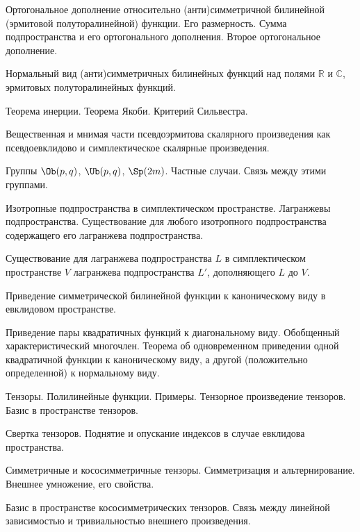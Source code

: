 \documentclass[a4paper]{article}
\begin{document}
\begin{nums}{-2}
\item  Ортогональное    дополнение    относительно
(анти)симметричной билинейной (эрмитовой полуторалинейной)
функции. Его размерность. Сумма подпространства и его
ортогонального дополнения. Второе ортогональное дополнение.

\item Нормальный вид (анти)симметричных билинейных функций над
полями $\mathbb{R}$ и $\mathbb{C}$, эрмитовых полуторалинейных
функций.

\item  Теорема инерции. Теорема Якоби. Критерий Сильвестра.

\item  Вещественная и мнимая части псевдоэрмитова скалярного
произведения как псевдоевклидово и симплектическое  скалярные
произведения.

\item  Группы $\Ob(p,q)$, $\Ub(p, q)$, $\Sp(2m)$. Частные случаи. Связь
между этими группами.

\item Изотропные подпространства в симплектическом пространстве.
Лагранжевы подпространства. Существование   для   любого
изотропного   подпространства   содержащего   его   лагранжева
подпространства.

\item  Существование   для   лагранжева подпространства   $L$  в
симплектическом   пространстве   $V$ лагранжева подпространства
$L'$, дополняющего $L$ до $V$.

\item Приведение   симметрической   билинейной   функции   к
каноническому   виду   в   евклидовом пространстве.

\item Приведение     пары     квадратичных     функций     к
диагональному     виду.      Обобщенный характеристический
многочлен. Теорема об одновременном приведении одной квадратичной
функции к каноническому виду, а другой (положительно определенной)
к нормальному виду.

\item  Тензоры.   Полилинейные  функции. Примеры.   Тензорное
произведение  тензоров.   Базис  в пространстве тензоров.

\item   Свертка тензоров. Поднятие и опускание индексов в случае
евклидова пространства.

\item Симметричные и кососимметричные тензоры. Симметризация и
альтернирование. Внешнее умножение, его свойства.

\item  Базис в пространстве кососимметрических тензоров. Связь между
линейной зависимостью и тривиальностью внешнего произведения.
\end{nums}

\medskip\dmvntrail
\end{document}
